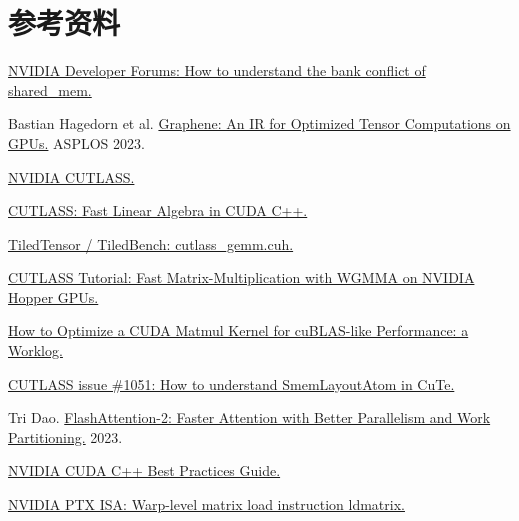 \documentclass[11pt,a4paper]{article}
\begin{document}
\section*{参考资料}
\begin{enumerate}[leftmargin=2em,label={[\arabic*]},itemsep=1em,topsep=1em]
\item \href{https://forums.developer.nvidia.com/t/how-to-understand-the-bank-conflict-of-shared-mem/260900}{NVIDIA Developer Forums: How to understand the bank conflict of shared\_mem.}
\item Bastian Hagedorn et al. \href{https://doi.org/10.1145/3582016.3582018}{Graphene: An IR for Optimized Tensor Computations on GPUs.} ASPLOS 2023.
\item \href{https://github.com/NVIDIA/cutlass}{NVIDIA CUTLASS.}
\item \href{https://developer.nvidia.com/blog/cutlass-linear-algebra-cuda/}{CUTLASS: Fast Linear Algebra in CUDA C++.}
\item \href{https://github.com/TiledTensor/TiledBench/blob/master/benchs/cpp/gemm/cutlass_gemm.cuh}{TiledTensor / TiledBench: cutlass\_gemm.cuh.}
\item \href{https://research.colfax-intl.com/cutlass-tutorial-wgmma-hopper/}{CUTLASS Tutorial: Fast Matrix-Multiplication with WGMMA on NVIDIA Hopper GPUs.}
\item \href{https://siboehm.com/articles/22/CUDA-MMM}{How to Optimize a CUDA Matmul Kernel for cuBLAS-like Performance: a Worklog.}
\item \href{https://github.com/NVIDIA/cutlass/issues/1051}{CUTLASS issue \#1051: How to understand SmemLayoutAtom in CuTe.}
\item Tri Dao. \href{https://arxiv.org/abs/2307.08691}{FlashAttention-2: Faster Attention with Better Parallelism and Work Partitioning.} 2023.
\item \href{https://docs.nvidia.com/cuda/cuda-c-best-practices-guide/}{NVIDIA CUDA C++ Best Practices Guide.}
\item \href{https://docs.nvidia.com/cuda/parallel-thread-execution/index.html#warp-level-matrix-load-instruction-ldmatrix}{NVIDIA PTX ISA: Warp-level matrix load instruction ldmatrix.}
\end{enumerate}
\end{document}
